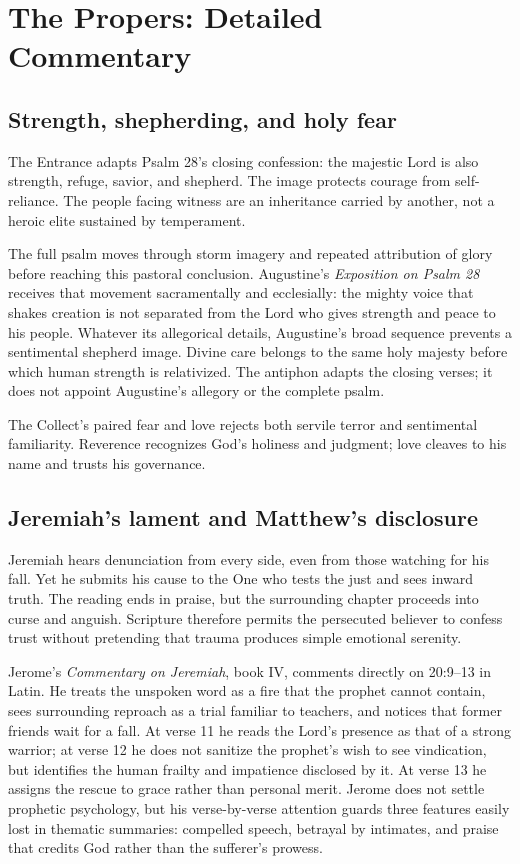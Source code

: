 \section*{The Propers: Detailed Commentary}

\subsection*{Strength, shepherding, and holy fear\enspace{}}

The Entrance adapts Psalm 28's closing confession: the majestic Lord is also strength, refuge, savior, and shepherd. The image protects courage from self-reliance. The people facing witness are an inheritance carried by another, not a heroic elite sustained by temperament.

The full psalm moves through storm imagery and repeated attribution of glory before reaching this pastoral conclusion. Augustine's \emph{Exposition on Psalm 28} receives that movement sacramentally and ecclesially: the mighty voice that shakes creation is not separated from the Lord who gives strength and peace to his people. Whatever its allegorical details, Augustine's broad sequence prevents a sentimental shepherd image. Divine care belongs to the same holy majesty before which human strength is relativized. The antiphon adapts the closing verses; it does not appoint Augustine's allegory or the complete psalm.

The Collect's paired fear and love rejects both servile terror and sentimental familiarity. Reverence recognizes God's holiness and judgment; love cleaves to his name and trusts his governance.

\subsection*{Jeremiah's lament and Matthew's disclosure\enspace{}}

Jeremiah hears denunciation from every side, even from those watching for his fall. Yet he submits his cause to the One who tests the just and sees inward truth. The reading ends in praise, but the surrounding chapter proceeds into curse and anguish. Scripture therefore permits the persecuted believer to confess trust without pretending that trauma produces simple emotional serenity.

Jerome's \emph{Commentary on Jeremiah}, book IV, comments directly on 20:9--13 in Latin. He treats the unspoken word as a fire that the prophet cannot contain, sees surrounding reproach as a trial familiar to teachers, and notices that former friends wait for a fall. At verse 11 he reads the Lord's presence as that of a strong warrior; at verse 12 he does not sanitize the prophet's wish to see vindication, but identifies the human frailty and impatience disclosed by it. At verse 13 he assigns the rescue to grace rather than personal merit. Jerome does not settle prophetic psychology, but his verse-by-verse attention guards three features easily lost in thematic summaries: compelled speech, betrayal by intimates, and praise that credits God rather than the sufferer's prowess.

